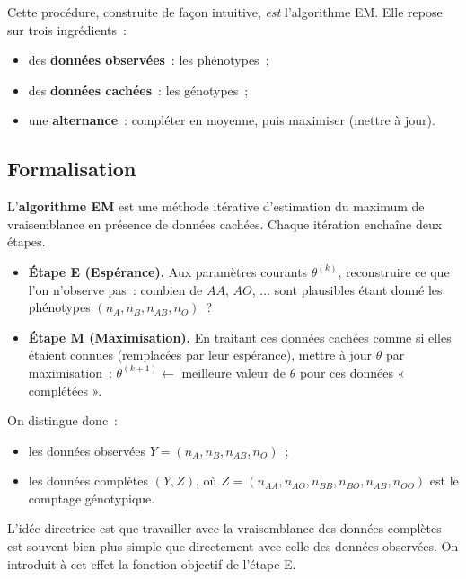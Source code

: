 Cette procédure, construite de façon intuitive, \textit{est} l'algorithme EM. Elle
repose sur trois ingrédients~:
\begin{itemize}
  \item des \textbf{données observées}~: les phénotypes~;
  \item des \textbf{données cachées}~: les génotypes~;
  \item une \textbf{alternance}~: compléter en moyenne, puis maximiser (mettre à
        jour).
\end{itemize}

\subsection{Formalisation}

\medskip

\begin{mdframed}
\begin{definition}
L'\textbf{algorithme EM} est une méthode itérative d'estimation du maximum de
vraisemblance en présence de données cachées. Chaque itération enchaîne deux
étapes.
\begin{itemize}
  \item \textbf{Étape E (Espérance).} Aux paramètres courants $\theta^{(k)}$,
        reconstruire ce que l'on n'observe pas~: combien de $AA$, $AO$, $\dots$
        sont plausibles étant donné les phénotypes $(n_A, n_B, n_{AB}, n_O)$~?
  \item \textbf{Étape M (Maximisation).} En traitant ces données cachées comme si
        elles étaient connues (remplacées par leur espérance), mettre à jour
        $\theta$ par maximisation~:
        $\theta^{(k+1)} \leftarrow$ meilleure valeur de $\theta$ pour ces données
        « complétées ».
\end{itemize}
\end{definition}
\end{mdframed}

On distingue donc~:
\begin{itemize}
  \item les données observées $Y = (n_A, n_B, n_{AB}, n_O)$~;
  \item les données complètes $(Y, Z)$, où $Z = (n_{AA}, n_{AO}, n_{BB}, n_{BO},
        n_{AB}, n_{OO})$ est le comptage génotypique.
\end{itemize}

L'idée directrice est que travailler avec la vraisemblance des données complètes
est souvent bien plus simple que directement avec celle des données observées.
On introduit à cet effet la fonction objectif de l'étape E.

